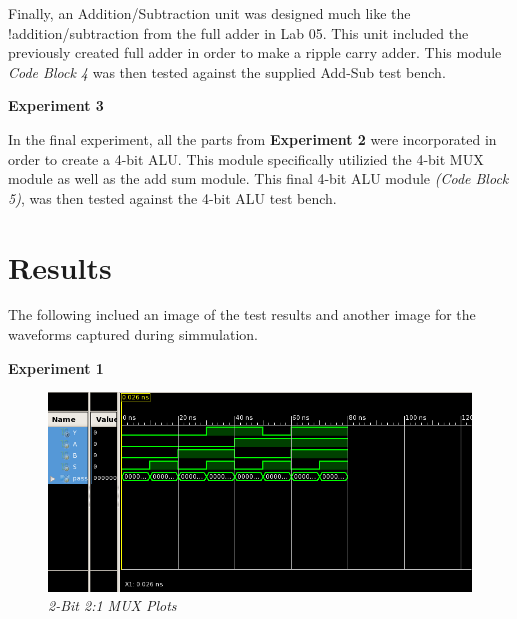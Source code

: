 \documentclass[a4paper,12pt]{article}
\begin{document}
Finally, an Addition/Subtraction unit was designed much like the !addition/subtraction from the full adder in Lab 05. This unit included the previously created full adder in order to make a ripple carry adder. This module \textit{Code Block 4} was then tested against the supplied Add-Sub test bench.


\vspace{5pt}

\hspace{-15pt}\textbf{Experiment 3}

In the final experiment, all the parts from \textbf{Experiment 2} were incorporated in order to create a 4-bit ALU. This module specifically utilizied the 4-bit MUX module as well as the add sum module. This final 4-bit ALU module \textit{(Code Block 5)}, was then tested against the 4-bit ALU test bench.



\section*{Results}

\hspace{15pt}The following inclued an image of the test results and another image for the waveforms captured during simmulation.

\hspace{-15pt}\textbf{Experiment 1}

\begin{figure}[h]
  \begin{center}
    \includegraphics[scale=1]{2_1MuxPlot.png}
    \caption{\textit{2-Bit 2:1 MUX Plots}}
  \end{center}
\end{figure}
\end{document}
